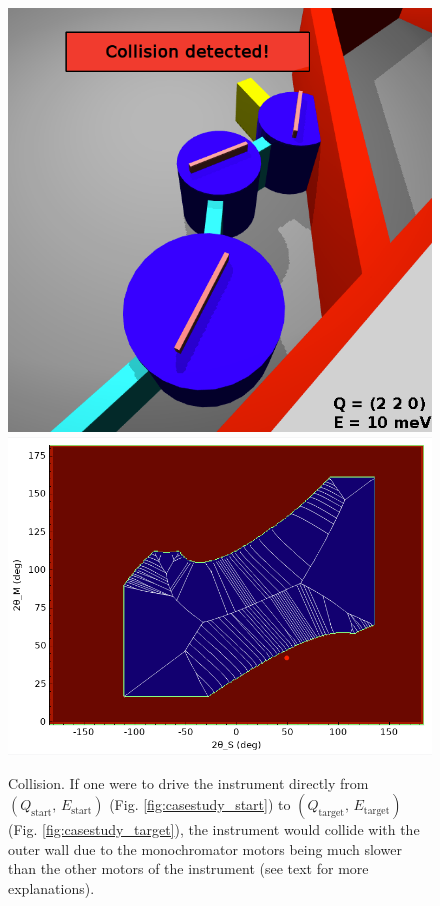 \begin{figure}[H]
		\begin{center}
			\includegraphics[width = 0.4 \textwidth]{figures/casestudy_2_2_0_10meV}
			\hspace{0.5cm}
			\includegraphics[width = 0.55 \textwidth]{figures/casestudy_2_2_0_10meV_cfg}
		\end{center}
	\caption[Case study: Collision.]{Collision. 
		If one were to drive the instrument directly from $\left(Q_\mathrm{start},\, E_\mathrm{start}\right)$ (Fig. \ref{fig:casestudy_start})
		to $\left(Q_\mathrm{target},\, E_\mathrm{target}\right)$ (Fig. \ref{fig:casestudy_target}), the instrument 
		would collide with the outer wall due to the monochromator motors being much slower than the other 
		motors of the instrument (see text for more explanations).
		\label{fig:casestudy_collision}}
\end{figure}



